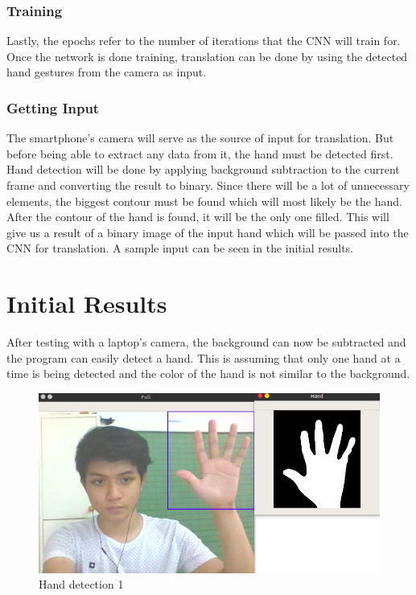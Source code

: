 \documentclass[journal]{./IEEE/IEEEtran}
\begin{document}
\subsubsection{Training}
Lastly, the epochs refer to the number of iterations that the CNN will train for. Once the network is done training, translation can be done by using the detected hand gestures from the camera as input.
\newline
\subsubsection{Getting Input}
The smartphone's camera will serve as the source of input for translation. But before being able to extract any data from it, the hand must be detected first. Hand detection will be done by applying background subtraction to the current frame and converting the result to binary. Since there will be a lot of unnecessary elements, the biggest contour must be found which will most likely be the hand. After the contour of the hand is found, it will be the only one filled. This will give us a result of a binary image of the input hand which will be passed into the CNN for translation. A sample input can be seen in the initial results.

\section{Initial Results}
After testing with a laptop's camera, the background can now be subtracted and the program can easily detect a hand. This is assuming that only one hand at a time is being detected and the color of the hand is not similar to the background.

\begin{figure}[ht!]
    \centering
    \includegraphics[width=.8\linewidth]{./images/init1.png}
    \caption{Hand detection 1}
    \label{fig:label1}
\end{figure}
\end{document}
